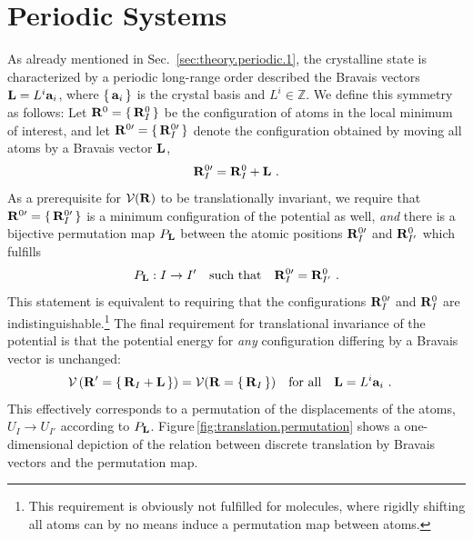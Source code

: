 \section{Periodic Systems}
As already mentioned in Sec.~\ref{sec:theory.periodic.1}, the crystalline state is characterized by a periodic long-range order described the Bravais vectors ${\bf L} = L^i {\bf a}_i$, where $\set{{\bf a}_i}$ is the crystal basis and $L^i \in \mathds Z$.
We define this symmetry as follows:
Let ${\bf R}^0 = \set{{\bf R}_I^0}$ be the configuration of atoms in the local minimum of interest, and let ${\bf R}^{0 \prime} = \set{{\bf R}^{0 \prime}_{I}}$ denote the configuration obtained by moving all atoms by a Bravais vector ${\bf L}$,
\begin{align}
	{\bf R}^{0 \prime}_{I} = {\bf R}^0_{I} + {\bf L}~.
	\label{eq:RI'}
\end{align}
As a prerequisite for $\mathcal V ({\bf R})$ to be translationally invariant, we require that ${\bf R}^{0 \prime} = \set{{\bf R}^{0 \prime}_{I}}$ is a minimum configuration of the potential as well, \emph{and} there is a bijective permutation map $P_{\bf L}$ between the atomic positions ${\bf R}^{0 \prime}_{I}$ and ${\bf R}^{0}_{I'}$ which fulfills
\begin{align}
	P_{\bf L} : I \to I' \quad\text{such that}\quad
	{\bf R}^{0 \prime}_{I}
		= {\bf R}^{0}_{I'}~.
	\label{eq:translation.permutation}
\end{align}
This statement is equivalent to requiring that the configurations ${\bf R}^{0 \prime}_{I}$ and ${\bf R}^{0}_{I}$ are indistinguishable.\footnote{This requirement is obviously not fulfilled for molecules, where rigidly shifting all atoms can by no means induce a permutation map between atoms.} 
The final requirement for translational invariance of the potential is that the potential energy for \emph{any} configuration differing by a Bravais vector is unchanged:
\begin{align}
	\mathcal{V} \left( {\bf R}' = \set{{\bf R}_{I} + {\bf L}} \right)
	&= \mathcal{V}({\bf R} = \set{{\bf R}_{I}} ) 
	\quad\text{for all}\quad {\bf L} = L^i {\bf a}_i~.
	\label{eq:inv.V}
\end{align}
This effectively corresponds to a permutation of the displacements of the atoms, $U_I \to U_{I'}$ according to $P_{\bf L}$. Figure\,\ref{fig:translation.permutation} shows a one-dimensional depiction of the relation between discrete translation by Bravais vectors and the permutation map.

